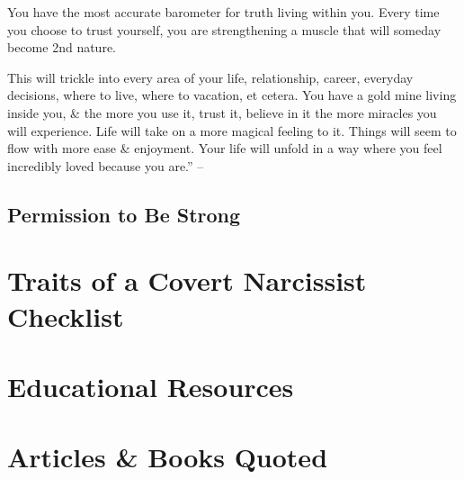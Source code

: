 \documentclass{article}
\numberwithin{equation}{section}
\begin{document}
You have the most accurate barometer for truth living within you. Every time you choose to trust yourself, you are strengthening a muscle that will someday become 2nd nature.

This will trickle into every area of your life, relationship, career, everyday decisions, where to live, where to vacation, et cetera. You have a gold mine living inside you, \& the more you use it, trust it, believe in it the more miracles you will experience. Life will take on a more magical feeling to it. Things will seem to flow with more ease \& enjoyment. Your life will unfold in a way where you feel incredibly loved because you are.'' -- \cite[pp. 166--168]{Mirza2017}

\subsection{Permission to Be Strong}


\section{Traits of a Covert Narcissist Checklist}


\section{Educational Resources}


\section{Articles \& Books Quoted}


\printbibliography[heading=bibintoc]
	
\end{document}

